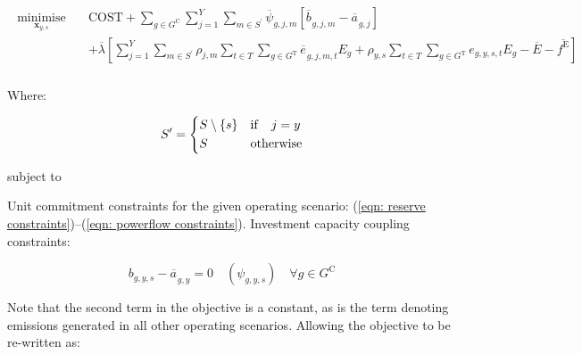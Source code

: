 \documentclass{article}
\newcommand{\sGeneratorsCandidate}{G^{\mathrm{C}}}
\newcommand{\sGeneratorsThermal}{G^{\mathrm{T}}}
\newcommand{\sYears}{Y}
\newcommand{\sScenarios}{S}
\newcommand{\sIntervals}{T}
\newcommand{\iGenerator}{g}
\newcommand{\iYear}{y}
\newcommand{\iYearAlias}{j}
\newcommand{\iScenario}{s}
\newcommand{\iScenarioAlias}{m}
\newcommand{\iInterval}{t}
\newcommand{\cScenarioDuration}[1][\iYear,\iScenario]{\rho_{#1}}
\newcommand{\cEmissionsIntensity}[1][\iGenerator]{E_{#1}}
\newcommand{\cEmmissionsCumulativeTarget}{\overline{E}}
\newcommand{\cObjectiveFunction}{\mathrm{COST}}
\newcommand{\vEnergy}[1][\iGenerator,\iYear,\iScenario,\iInterval]{e_{#1}}
\newcommand{\vEmissionsTargetViolation}{f^{\mathrm{E}}}
\newcommand{\vInstalledCapacityTotal}[1][\iGenerator,\iYear]{a_{#1}}
\newcommand{\vInstalledCapacityTotalScenario}[1][\iGenerator,\iYear,\iScenario]{b_{#1}}
\DeclareMathOperator*{\minimise}{minimise}
\begin{document}
\begin{align}
	\begin{split}
		\minimise\limits_{\bm{x}_{\iYear,\iScenario}} \quad &\cObjectiveFunction + \sum\limits_{\iGenerator \in \sGeneratorsCandidate}\sum\limits_{\iYearAlias=1}^{\sYears}\sum\limits_{\iScenarioAlias \in \sScenarios^{\prime}} \overline{\psi}_{\iGenerator,\iYearAlias,\iScenarioAlias}\left[\overline{\vInstalledCapacityTotalScenario[]}_{\iGenerator,\iYearAlias,\iScenarioAlias} - \overline{\vInstalledCapacityTotal[]}_{\iGenerator,\iYearAlias}\right]\\
		& + \overline{\lambda} \left[\sum\limits_{\iYearAlias=1}^{\sYears} \sum\limits_{\iScenarioAlias \in \sScenarios^{\prime}} \cScenarioDuration[\iYearAlias,\iScenarioAlias] \sum\limits_{\iInterval \in \sIntervals} \sum\limits_{\iGenerator \in \sGeneratorsThermal} \overline{\vEnergy[]}_{\iGenerator,\iYearAlias,\iScenarioAlias,\iInterval} \cEmissionsIntensity + \cScenarioDuration\sum\limits_{\iInterval \in \sIntervals}\sum\limits_{\iGenerator \in \sGeneratorsThermal} \vEnergy[\iGenerator,\iYear,\iScenario,\iInterval] \cEmissionsIntensity - \cEmmissionsCumulativeTarget - \overline{\vEmissionsTargetViolation}\right]\\
	\end{split}
\end{align}

Where:

\begin{equation}
	\sScenarios^{\prime} = 
	\begin{dcases}
	\sScenarios \setminus \{\iScenario\} & \mathrm{if} \quad \iYearAlias = \iYear\\
	\sScenarios & \mathrm{otherwise}\\
	\end{dcases}
\end{equation}

subject to

Unit commitment constraints for the given operating scenario: (\ref{eqn: reserve constraints})--(\ref{eqn: powerflow constraints}). Investment capacity coupling constraints:

\begin{equation}
\vInstalledCapacityTotalScenario - \overline{\vInstalledCapacityTotal[]}_{\iGenerator,\iYear} = 0 \quad (\psi_{\iGenerator,\iYear,\iScenario}) \quad \forall \iGenerator \in \sGeneratorsCandidate
\end{equation}

Note that the second term in the objective is a constant, as is the term denoting emissions generated in all other operating scenarios. Allowing the objective to be re-written as:
\end{document}

